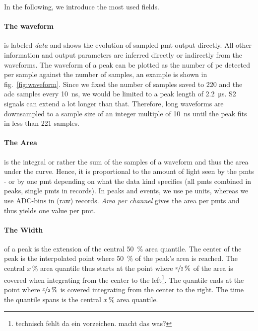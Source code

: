 In the following, we introduce the most used fields.

\paragraph{The waveform} is labeled \emph{data} and shows the evolution of sampled \gls{pmt} output directly.
All other information and output parameters are inferred directly or indirectly from the waveforms.
The waveform of a peak can be plotted as the number of \gls{pe} detected per sample against the number of samples, an example is shown in fig.~\ref{fig:waveform}.
Since we fixed the number of samples saved to 220 and the \gls{adc} samples every \SI{10}{\nano\second}, we would be limited to a peak length of \SI{2.2}{\micro\second}.
S2 signals can extend a lot longer than that.
Therefore, long waveforms are downsampled to a sample size of an integer multiple of \SI{10}{\nano\second} until the peak fits in less than 221 samples.

\paragraph{The Area} is the integral or rather the sum of the samples of a waveform and thus the area under the curve.
Hence, it is proportional to the amount of light seen by the \glspl{pmt} - or by one \gls{pmt} depending on what the data kind specifies (all \glspl{pmt} combined in peaks, single \glspl{pmt} in records).
In peaks and events, we use \gls{pe} units, whereas we use $ \mathrm{ADC\mbox{-}bins} $ in (raw) records.
\emph{Area per channel} gives the area per \glspl{pmt} and thus yields one value per \gls{pmt}.

\paragraph{The Width} of a peak is the extension of the central \SI{50}{\%} area quantile.
The center of the peak is the interpolated point where \SI{50}{\%} of the peak's area is reached.
The central $ x\,\% $ area quantile thus starts at the point where $ \nicefrac{x}{2}\,\% $ of the area is covered when integrating from the center to the left\footnote{technisch fehlt da ein vorzeichen. macht das was?}.
The quantile ends at the point where $ \nicefrac{x}{2}\,\% $ is covered integrating from the center to the right.
The time the quantile spans is the central $ x\,\% $ area quantile.

